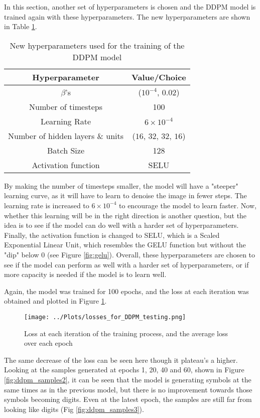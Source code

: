\documentclass[12pt]{report} %
\begin{document}
In this section, another set of hyperparameters is chosen and the DDPM model is trained again with these hyperparameters. The new hyperparameters are shown in Table \ref{tab:hyperparams2}.

\begin{table}[h]
  \centering
  \begin{tabular}{c c}
    \hline
    Hyperparameter & Value/Choice \\
    \hline
    $\beta$'s & ($10^{-4}$, $0.02$) \\
    Number of timesteps & 100 \\
    Learning Rate & $6 \times 10^{-4}$ \\
    Number of hidden layers \& units & ($16$, $32$, $32$, $16$) \\
    Batch Size & 128 \\
    Activation function & SELU \\
    \hline
  \end{tabular}
  \caption{New hyperparameters used for the training of the DDPM model}
  \label{tab:hyperparams2}
\end{table}

By making the number of timesteps smaller, the model will have a "steeper" learning curve, as it will have to learn to denoise the image in fewer steps. The learning rate is increased to $6 \times 10^{-4}$ to encourage the model to learn faster. Now, whether this learning will be in the right direction is another question, but the idea is to see if the model can do well with a harder set of hyperparameters. Finally, the activation function is changed to SELU, which is a Scaled Exponential Linear Unit, which resembles the GELU function but without the "dip" below 0 (see Figure \ref{fig:gelu}). Overall, these hyperparameters are chosen to see if the model can perform as well with a harder set of hyperparameters, or if more capacity is needed if the model is to learn well.

Again, the model was trained for 100 epochs, and the loss at each iteration was obtained and plotted in Figure \ref{fig:loss2}.

\begin{figure}[h]
  \centering
  \texttt{[image: ../Plots/losses\_for\_DDPM\_testing.png]}
  \caption{Loss at each iteration of the training process, and the average loss over each epoch}
  \label{fig:loss2}
\end{figure}


The same decrease of the loss can be seen here though it plateau's a higher. Looking at the samples generated at epochs 1, 20, 40 and 60, shown in Figure \ref{fig:ddpm_samples2}, it can be seen that the model is generating symbols at the same times as in the previous model, but there is no improvement towards those symbols becoming digits. Even at the latest epoch, the samples are still far from looking like digits (Fig \ref{fig:ddpm_samples3}).
\end{document}
